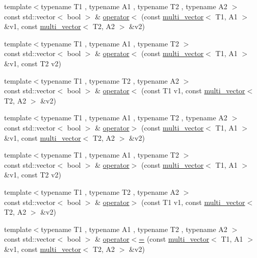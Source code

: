 \begin{DoxyCompactItemize}
\item 
{\footnotesize template$<$typename T1 , typename A1 , typename T2 , typename A2 $>$ }\\const std\-::vector$<$ bool $>$ \& \hyperlink{namespaceIceBRG_a97d457a38fd83f749dc536408f9dcce7}{operator$<$} (const \hyperlink{classIceBRG_1_1multi__vector}{multi\-\_\-vector}$<$ T1, A1 $>$ \&v1, const \hyperlink{classIceBRG_1_1multi__vector}{multi\-\_\-vector}$<$ T2, A2 $>$ \&v2)
\item 
{\footnotesize template$<$typename T1 , typename A1 , typename T2 $>$ }\\const std\-::vector$<$ bool $>$ \& \hyperlink{namespaceIceBRG_ad027dea3a036f6b7fe3e9569264b0ef4}{operator$<$} (const \hyperlink{classIceBRG_1_1multi__vector}{multi\-\_\-vector}$<$ T1, A1 $>$ \&v1, const T2 v2)
\item 
{\footnotesize template$<$typename T1 , typename T2 , typename A2 $>$ }\\const std\-::vector$<$ bool $>$ \& \hyperlink{namespaceIceBRG_aebc2ba24a7364380cba288a9dc0e11bb}{operator$<$} (const T1 v1, const \hyperlink{classIceBRG_1_1multi__vector}{multi\-\_\-vector}$<$ T2, A2 $>$ \&v2)
\item 
{\footnotesize template$<$typename T1 , typename A1 , typename T2 , typename A2 $>$ }\\const std\-::vector$<$ bool $>$ \& \hyperlink{namespaceIceBRG_af66da99a25ff1a0c0a0648d6f4cacafd}{operator$>$} (const \hyperlink{classIceBRG_1_1multi__vector}{multi\-\_\-vector}$<$ T1, A1 $>$ \&v1, const \hyperlink{classIceBRG_1_1multi__vector}{multi\-\_\-vector}$<$ T2, A2 $>$ \&v2)
\item 
{\footnotesize template$<$typename T1 , typename A1 , typename T2 $>$ }\\const std\-::vector$<$ bool $>$ \& \hyperlink{namespaceIceBRG_a23c02407348b8ccead4ef56ace20dbea}{operator$>$} (const \hyperlink{classIceBRG_1_1multi__vector}{multi\-\_\-vector}$<$ T1, A1 $>$ \&v1, const T2 v2)
\item 
{\footnotesize template$<$typename T1 , typename T2 , typename A2 $>$ }\\const std\-::vector$<$ bool $>$ \& \hyperlink{namespaceIceBRG_afdb9ff9e0936048867925814e5b812c5}{operator$>$} (const T1 v1, const \hyperlink{classIceBRG_1_1multi__vector}{multi\-\_\-vector}$<$ T2, A2 $>$ \&v2)
\item 
{\footnotesize template$<$typename T1 , typename A1 , typename T2 , typename A2 $>$ }\\const std\-::vector$<$ bool $>$ \& \hyperlink{namespaceIceBRG_a6202208614894a948e4e2a42c21a7e02}{operator$<$=} (const \hyperlink{classIceBRG_1_1multi__vector}{multi\-\_\-vector}$<$ T1, A1 $>$ \&v1, const \hyperlink{classIceBRG_1_1multi__vector}{multi\-\_\-vector}$<$ T2, A2 $>$ \&v2)

\end{DoxyCompactItemize}
